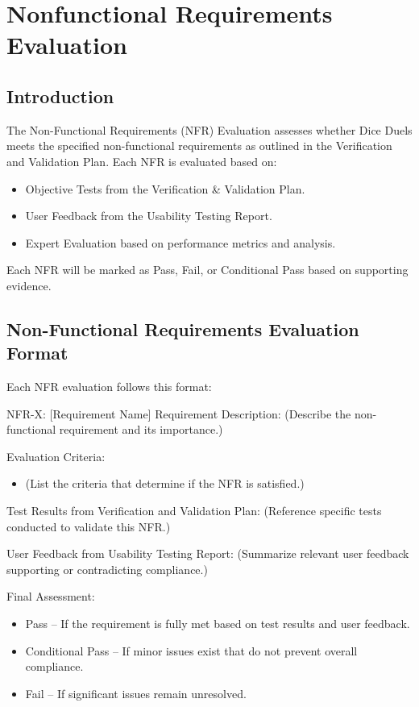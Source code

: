\documentclass[12pt, titlepage]{article}
\begin{document}
\section{Nonfunctional Requirements Evaluation}

\subsection{Introduction}

The Non-Functional Requirements (NFR) Evaluation assesses whether Dice Duels meets the specified non-functional requirements as outlined in the Verification and Validation Plan. Each NFR is evaluated based on:
\begin{itemize}
	\item Objective Tests from the Verification \& Validation Plan.
	\item User Feedback from the Usability Testing Report.
	\item Expert Evaluation based on performance metrics and analysis.
\end{itemize}
Each NFR will be marked as Pass, Fail, or Conditional Pass based on supporting evidence.

\subsection{Non-Functional Requirements Evaluation Format}

Each NFR evaluation follows this format:

NFR-X: [Requirement Name]
Requirement Description:
(Describe the non-functional requirement and its importance.)

Evaluation Criteria:
\begin{itemize}
    \item (List the criteria that determine if the NFR is satisfied.)
\end{itemize}
Test Results from Verification and Validation Plan:
(Reference specific tests conducted to validate this NFR.)

User Feedback from Usability Testing Report:
(Summarize relevant user feedback supporting or contradicting compliance.)

Final Assessment:
\begin{itemize}
    \item Pass – If the requirement is fully met based on test results and user feedback.
    \item Conditional Pass – If minor issues exist that do not prevent overall compliance.
    \item Fail – If significant issues remain unresolved.
\end{itemize}
\end{document}
